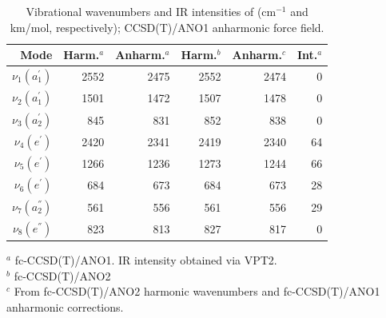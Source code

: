 \begin{table}[ht]
  \caption{Vibrational wavenumbers and IR intensities of \cycD (cm$^{-1}$ and km/mol, respectively); CCSD(T)/ANO1 anharmonic force field.}
    \begin{center}
    \begin{tabular}{rrrrrr} \hline
    
        Mode & Harm.$^a$ & Anharm.$^a$ & Harm.$^b$ & Anharm.$^c$ & Int.$^a$ \\ \hline
        $\nu_{1}(a^{'}_1)$ & 2552 & 2475 & 2552 & 2474 & 0  \\ %
        $\nu_{2}(a^{'}_1)$ & 1501 & 1472 & 1507 & 1478 & 0  \\ %
        $\nu_{3}(a^{'}_2)$ &  845 &  831 &  852 &  838 & 0  \\ %
        $\nu_{4}(e^{'})$   & 2420 & 2341 & 2419 & 2340 & 64  \\ %
        $\nu_{5}(e^{'})$   & 1266 & 1236 & 1273 & 1244 & 66  \\ %
        $\nu_{6}(e^{'})$   &  684 &  673 &  684 &  673 & 28  \\ %
        $\nu_{7}(a^{''}_2)$&  561 &  556 &  561 &  556 & 29  \\ %
        $\nu_{8}(e^{''})$  &  823 &  813 &  827 &  817 & 0  \\ %
                \bottomrule
        \hline
    \end{tabular}
    \end{center}
    $^a$ fc-CCSD(T)/ANO1. IR intensity obtained via VPT2.\\
    $^b$ fc-CCSD(T)/ANO2\\
    $^c$ From fc-CCSD(T)/ANO2 harmonic wavenumbers and fc-CCSD(T)/ANO1 anharmonic corrections.
\end{table}


